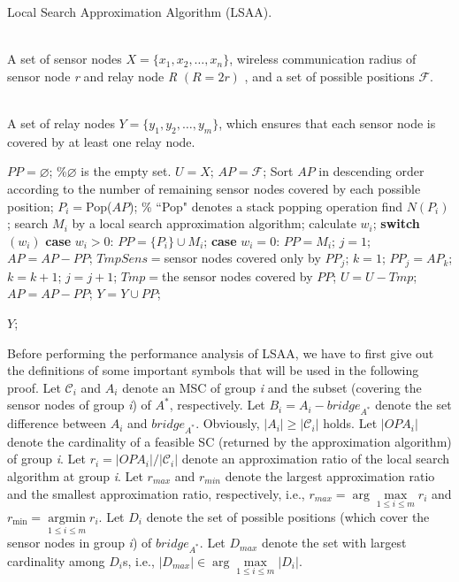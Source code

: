 \documentclass[journal]{IEEEtran}
\begin{document}
\begin{algorithm}[htb]         \caption{Local Search Approximation Algorithm (LSAA).}             
\label{LSAA}                  
\begin{algorithmic}[1]                
\REQUIRE ~~\\                          
   A set of sensor nodes $X=\{x_1, x_2, \ldots, x_n\}$, wireless communication radius of sensor node \emph{r} and relay node \emph{R} $(R=2r)$ , and a set of possible positions $\mathcal{F}$.

\ENSURE ~~\\                           
    A set of relay nodes $Y=\{y_1, y_2, \ldots, y_m\}$, which ensures that each sensor node is covered by at least one relay node.

\STATE $PP=\varnothing$; \%$\varnothing$ is the empty set.
\STATE $U=X$;
\STATE $AP=\mathcal{F}$;
\STATE Sort $AP$ in descending order according to the number of remaining sensor nodes covered by each possible position;
\STATE $P_i=$Pop($AP$); \% ``Pop" denotes a stack popping operation
\STATE find $N(P_i)$;
\STATE search $M_i$ by a local search approximation algorithm;
\STATE calculate $w_i$;
\STATE \textbf{switch}$(w_i)$
\STATE \quad  \textbf{case} $w_i>0$: $PP=\{P_i\}\cup M_i$;
\STATE \quad  \textbf{case} $w_i=0$: $PP= M_i$;
\STATE $j=1$;
\STATE   $AP=AP-PP$;
\STATE   $TmpSens=$sensor nodes covered only by $PP_j$;
\STATE $k=1$;
\STATE $PP_j=AP_k$;
\ENDIF
\STATE $k=k+1$;
\ENDWHILE
\STATE $j=j+1$;
\ENDWHILE
\STATE $Tmp=$the sensor nodes covered by $PP$;
\STATE $U=U-Tmp$;
\STATE $AP=AP-PP$;
\STATE $Y=Y\cup PP$;
\ENDWHILE

\RETURN $Y$;                
\end{algorithmic}

\end{algorithm}

Before performing the performance analysis of LSAA, we have to first give out the definitions of some important symbols that will be used in the following proof.
 Let $\mathcal{C}_i$ and $A_i$ denote an MSC of group \emph{i} and the subset (covering the sensor nodes of group \emph{i}) of $A^*$, respectively. Let $B_i=A_i-bridge_{A^*}$ denote the set difference between $A_i$ and $bridge_{A^*}$. Obviously, $|A_i|\geq|\mathcal{C}_i|$ holds. Let $|OPA_i|$ denote the cardinality of a feasible SC (returned by the approximation algorithm) of group \emph{i}. Let $r_i=|OPA_i|/|\mathcal{C}_i|$ denote an approximation ratio of the local search algorithm at group \emph{i}. Let $r_{max}$ and $r_{min}$ denote the largest approximation ratio and the smallest approximation ratio, respectively, i.e., $r_{max}= \arg{\max\limits_{1\leq i\leq m}r_i}$ and ${r_{\min }} = \mathop {\arg \min }\limits_{1 \le i \le m} {r_i}$.
Let $D_i$ denote the set of possible positions (which cover the sensor nodes in group \emph{i}) of $bridge_{A^*}$.
Let $D_{max}$ denote the set with largest cardinality among $D_i$s, i.e., $|D_{max}|\in \arg{\max\limits_{1\leq i\leq m}|D_i|}$.
\end{document}
